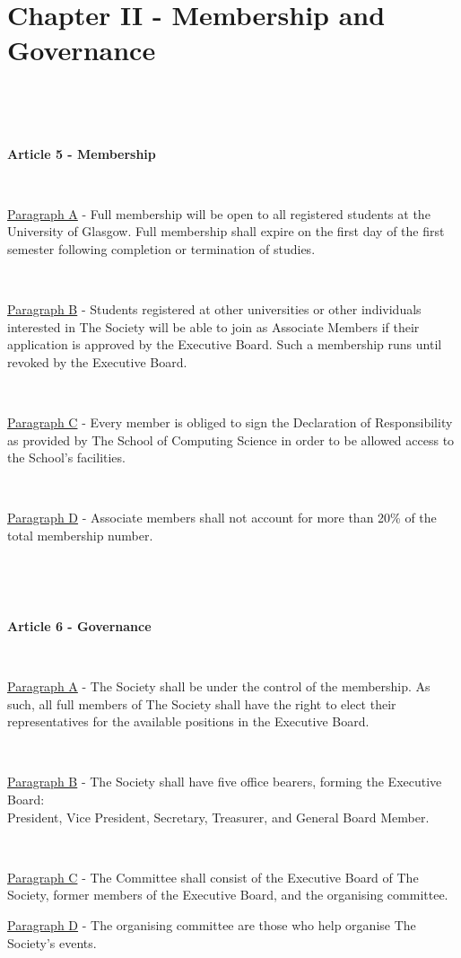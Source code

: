 \section{Chapter II - Membership and Governance}

~

~

\large{\textbf{Article 5 - Membership}}

~

\underline{Paragraph A} - Full membership will be open to all registered
students at the University of Glasgow. Full membership shall expire on the first day of the first
semester following completion or termination of studies.

~

\underline{Paragraph B} - Students registered at other universities or
other individuals interested in The Society will be able to join as
Associate Members if their application is approved by the Executive Board.
Such a membership runs until revoked by the Executive Board.

~

\underline{Paragraph C} - Every member is obliged to sign the
Declaration of Responsibility as provided by The School of Computing
Science in order to be allowed access to the School's facilities.

~

\underline{Paragraph D} - Associate members shall not account for more
than 20\% of the total membership number.

~

~

\large{\textbf{Article 6 - Governance}}

~

\underline{Paragraph A} - The Society shall be under the control of the
membership. As such, all full members of The Society shall have the
right to elect their representatives for the available positions in the
Executive Board.

~

\underline{Paragraph B} - The Society shall have five office bearers,
forming the Executive Board:\\
President, Vice President, Secretary, Treasurer, and General Board Member.

~

\underline{Paragraph C} - The Committee shall consist of the Executive
Board of The Society, former members of the Executive Board, and the
organising committee.

\underline{Paragraph D} - The organising committee are those who help
organise The Society's events.

